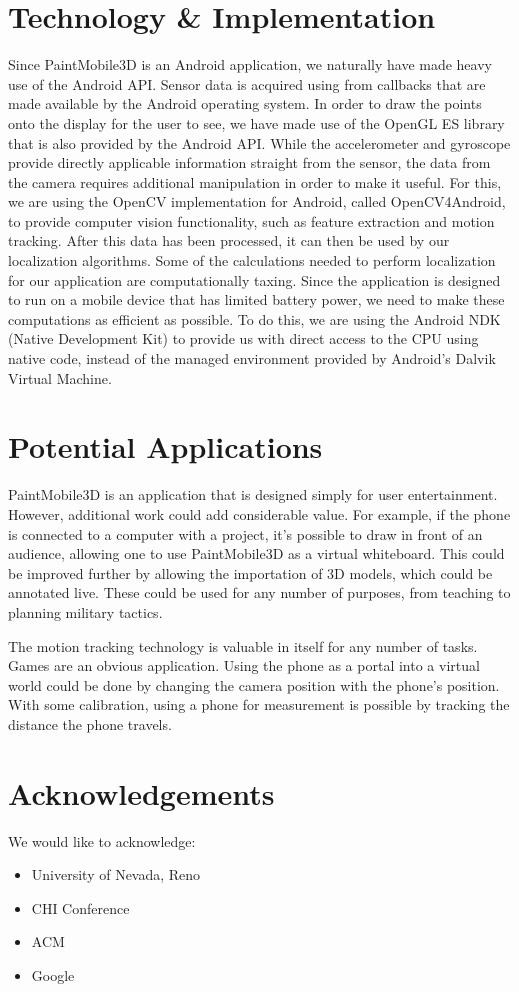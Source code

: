 \documentclass{chi-ext}
\begin{document}
\pagebreak

\section{Technology \& Implementation}

Since PaintMobile3D is an Android application, we naturally have made heavy
use of the Android API. Sensor data is acquired using from callbacks that are
made available by the Android operating system. In order to draw the points
onto the display for the user to see, we have made use of the OpenGL ES
library that is also provided by the Android API. While the accelerometer and
gyroscope provide directly applicable information straight from the sensor,
the data from the camera requires additional manipulation in order to make it
useful. For this, we are using the OpenCV implementation for Android, called
OpenCV4Android, to provide computer vision functionality, such as feature
extraction and motion tracking. After this data has been processed, it can
then be used by our localization algorithms. Some of the calculations needed
to perform localization for our application are computationally taxing. Since
the application is designed to run on a mobile device that has limited battery
power, we need to make these computations as efficient as possible. To do
this, we are using the Android NDK (Native Development Kit) to provide us with
direct access to the CPU using native code, instead of the managed environment
provided by Android's Dalvik Virtual Machine.

\section{Potential Applications}

PaintMobile3D is an application that is designed simply for user entertainment. However, additional work could add
considerable value. For example, if the phone is connected to a computer with a project, it's possible to draw in front of an audience,
allowing one to use PaintMobile3D as a virtual whiteboard. This could be improved further by allowing the importation of
3D models, which could be annotated live. These could be used for any number of purposes, from teaching to planning military tactics.

The motion tracking technology is valuable in itself for any number of tasks. Games are an obvious application. Using the phone as a
portal into a virtual world could be done by changing the camera position with the phone's position. With some calibration, using a
phone for measurement is possible by tracking the distance the phone travels.


\section{Acknowledgements}

We would like to acknowledge:

\begin{itemize}
\item
University of Nevada, Reno
\item
CHI Conference
\item
ACM
\item
Google
\end{itemize}

\balance



\end{document}
